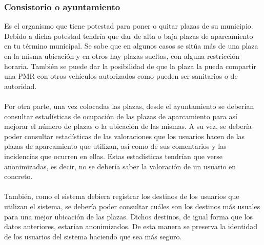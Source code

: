 \subsubsection{Consistorio o ayuntamiento}
Es el organismo que tiene potestad para poner o quitar plazas de su municipio. Debido a dicha potestad tendría que dar de alta o baja plazas de aparcamiento en tu término municipal. Se sabe que en algunos casos se sitúa más de una plaza en la misma ubicación y en otros hay plazas sueltas, con alguna restricción horaria. También se puede dar la posibilidad de que la plaza la pueda compartir una PMR con otros vehículos autorizados como pueden ser sanitarios o de autoridad.
\\\\
Por otra parte, una vez colocadas las plazas, desde el ayuntamiento se deberían consultar estadísticas de ocupación de las plazas de aparcamiento para así mejorar el número de plazas o la ubicación de las mismas. A su vez, se debería poder consultar estadísticas de las valoraciones que los usuarios hacen de las plazas de aparcamiento que utilizan, así como de sus comentarios y las incidencias que ocurren en ellas. Estas estadísticas tendrían que verse anonimizadas, es decir, no se debería saber la valoración de un usuario en concreto.
\\\\
También, como el sistema debiera registrar los destinos de los usuarios que utilizan el sistema, se debería poder consultar cuáles son los destinos más usuales para una mejor ubicación de las plazas. Dichos destinos, de igual forma que los datos anteriores, estarían anonimizados. De esta manera se preserva la identidad de los usuarios del sistema haciendo que sea más seguro.
